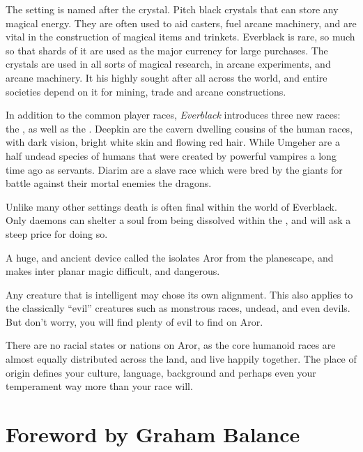 \begin{enumerate}
  The setting is named after the 
 crystal. Pitch black crystals that can store any magical energy. They are
 often used to aid casters, fuel arcane machinery, and are vital in the
 construction of magical items and trinkets. Everblack is rare, so much so
 that shards of it are used as the major currency for large purchases. The
 crystals are used in all sorts of magical research, in arcane experiments,
 and arcane machinery. It his highly sought after all across the world, and
 entire societies depend on it for mining, trade and arcane constructions.

  In addition to the common player races, \emph{Everblack}
 introduces three new races: the , 
 as well as the . Deepkin are the cavern dwelling cousins
 of the human races, with dark vision, bright white skin and flowing red
 hair. While Umgeher are a half undead species of humans that were created by
 powerful vampires a long time ago as servants. Diarim are a slave race which
 were bred by the giants for battle against their mortal enemies the dragons.

  Unlike many other settings death is often final
 within the world of Everblack. Only daemons can shelter a soul from being
 dissolved within the , and will ask a steep price for
 doing so.

  A huge, and ancient device called the
  isolates Aror from the planescape, and makes inter
 planar magic difficult, and dangerous.

  Any creature that is intelligent may chose
 its own alignment. This also applies to the classically ``evil'' creatures
 such as monstrous races, undead, and even devils. But don't worry, you will
 find plenty of evil to find on Aror.

  There are no racial states or nations on Aror, as
 the core humanoid races are almost equally distributed across the land, and
 live happily together. The place of origin defines your culture, language,
 background and perhaps even your temperament way more than your race will.

\end{enumerate}

\pagebreak

\onecolumn
\section{Foreword by Graham Balance}

